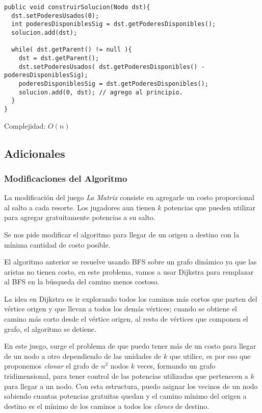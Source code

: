 \footnotesize\begin{verbatim}
public void construirSolucion(Nodo dst){
  dst.setPoderesUsados(0);
  int poderesDisponiblesSig = dst.getPoderesDisponibles();
  solucion.add(dst);

  while( dst.getParent() != null ){
    dst = dst.getParent();
    dst.setPoderesUsados( dst.getPoderesDisponibles() - poderesDisponiblesSig);
    poderesDisponiblesSig = dst.getPoderesDisponibles();
    solucion.add(0, dst); // agrego al principio. 
  }
}
\end{verbatim}\normalsize

Complejidad: $O(n)$

\subsection{Adicionales}

\subsubsection{Modificaciones del Algoritmo}

La modificaci\'on del juego \textit{La Matrix} consiste en agregarle un costo proporcional al salto a cada resorte. Los jugadores aun tienen $k$ potencias que pueden utilizar para agregar gratuitamente potencias a su salto.

Se nos pide modificar el algoritmo para llegar de un origen a destino con la m\'inima cantidad de costo posible.

El algoritmo anterior se resuelve usando BFS sobre un grafo din\'amico ya que las aristas no tienen costo, en este problema, vamos a usar Dijkstra para remplazar al BFS en la b\'usqueda del camino menos costoso.

La idea en Dijkstra es ir explorando todos los caminos m\'as cortos que parten del v\'ertice origen y que llevan a todos los dem\'as v\'ertices; cuando se obtiene el camino m\'as corto desde el v\'ertice origen, al resto de v\'ertices que componen el grafo, el algoritmo se detiene.

En este juego, surge el problema de que puedo tener m\'as de un costo para llegar de un nodo a otro dependiendo de las unidades de $k$ que utilice, es por eso que proponemos \textit{clonar} el grafo de $n^2$ nodos $k$ veces, formando un grafo tridimensional, para tener control de las potencias utilizadas que pertenecen a $k$ para llegar a un nodo. Con esta estructura, puedo asignar los vecinos de un nodo sabiendo cuantas potencias gratuitas quedan y el camino m\'inimo del origen a destino es el m\'inimo de los caminos a todos los \textit{clones} de destino.


